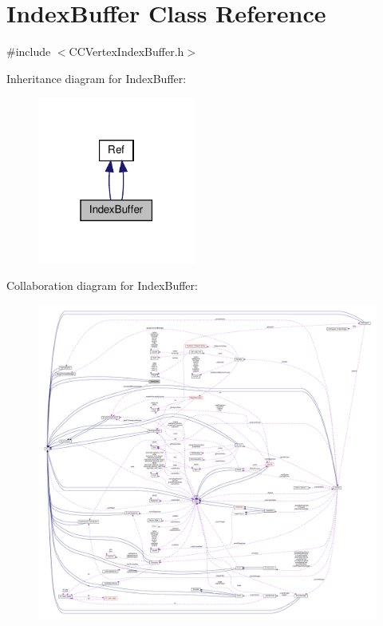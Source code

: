 \hypertarget{classIndexBuffer}{}\section{Index\+Buffer Class Reference}
\label{classIndexBuffer}


{\ttfamily \#include $<$C\+C\+Vertex\+Index\+Buffer.\+h$>$}



Inheritance diagram for Index\+Buffer\+:
\nopagebreak
\begin{figure}[H]
\begin{center}
\leavevmode
\includegraphics[width=147pt]{classIndexBuffer__inherit__graph}
\end{center}
\end{figure}


Collaboration diagram for Index\+Buffer\+:
\nopagebreak
\begin{figure}[H]
\begin{center}
\leavevmode
\includegraphics[width=350pt]{classIndexBuffer__coll__graph}
\end{center}
\end{figure}
